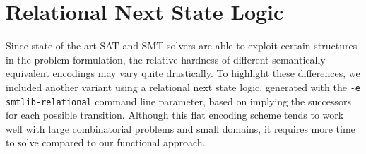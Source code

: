 \section{Relational Next State Logic}

Since state of the art SAT and SMT solvers are able to exploit certain structures in the problem formulation, the relative hardness of different semantically equivalent encodings may vary quite drastically.
To highlight these differences,
we included another variant using a relational next state logic,
generated with the \texttt{-e smtlib-relational} command line parameter, %
based on implying the successors for each possible transition.
Although this flat encoding scheme tends to work well with large combinatorial problems and small domains,  it requires  more time to solve compared to our functional approach. %

